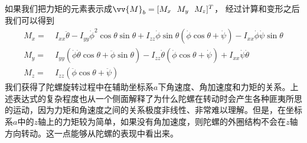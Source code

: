 \documentclass[11pt]{article}
\begin{document}

如果我们把力矩的元素表示成$\vv{M}_b = [M_x \ \ M_y \ \ M_z]^T$，
经过计算和变形之后我们可以得到
\begin{align}
M_x = &	\ I_{xx}\ddot{\theta} - I_{yy}\dot{\phi}^2\cos\theta\sin\theta + I_{zz}\dot{\phi}\sin\theta(\dot{\phi}\cos\theta + \dot{\psi}) - I_{xx}\dot{\phi}\dot{\psi}\sin\theta \\ 
M_y = & \ I_{yy}(\dot{\phi}\dot{\theta}\cos\theta + \ddot{\phi}\sin\theta) - I_{zz}\dot{\theta}(\dot{\phi}\cos\theta + \dot{\psi}) + I_{xx}\dot{\psi}\dot{\theta}	\\
M_z = & \ I_{zz}(\ddot{\phi}\cos\theta + \ddot{\psi}) %
\end{align}
我们获得了陀螺旋转过程中在辅助坐标系$a$下角速度、角加速度和力矩的关系。上述表达式的复杂程度也从一个侧面解释了为什么陀螺在转动时会产生各种匪夷所思的运动，因为力矩和角速度之间的关系极度非线性、非常难以理解。但是，在坐标系$a$中的$z$轴上的力矩较为简单，如果没有角加速度，则陀螺的外圈结构不会在$z$轴方向转动。这一点能够从陀螺的表现中看出来。
\end{document}
